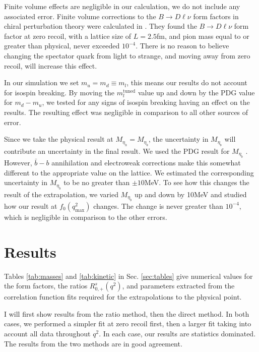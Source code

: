 Finite volume effects are negligible in our calculation, we do not include any associated error. Finite volume corrections to the $B\to D\ell\nu$ form factors in chiral perturbation theory were calculated in \cite{Laiho:2005ue}. They found the $B\to D\ell\nu$ form factor at zero recoil, with a lattice size of $L=2.5$fm, and pion mass equal to or greater than physical, never exceeded $10^{-4}$. There is no reason to believe changing the spectator quark from light to strange, and moving away from zero recoil, will increase this effect.

In our simulation we set $m_u=m_d\equiv m_l$, this means our results do not account for isospin breaking. By moving the $m_l^{\text{tuned}}$ value up and down by the PDG value for $m_d-m_u$, we tested for any signs of isospin breaking having an effect on the results. The resulting effect was negligible in comparison to all other sources of error.

Since we take the physical result at $M_{\eta_h}=M_{\eta_b}$, the uncertainty in $M_{\eta_b}$ will contribute an uncertainty in the final result. We used the PDG result for $M_{\eta_b}$ \cite{PhysRevD.98.030001}. However, $\bar{b}-b$ annihilation and electroweak corrections make this somewhat different to the appropriate value on the lattice. We estimated the corresponding uncertainty in $M_{\eta_b}$ to be no greater than $\pm10$MeV. To see how this changes the result of the extrapolation, we varied $M_{\eta_b}$ up and down by 10MeV and studied how our result at $f_0(q^2_{\text{max}})$ changes. The change is never greater than $10^{-4}$, which is negligible in comparison to the other errors.

\section{Results}
\label{sec:results}

Tables \ref{tab:masses} and \ref{tab:kinetic} in Sec. \ref{sec:tables} give numerical values for the form factors, the ratios $R_{0,+}^s(q^2)$, and parameters extracted from the correlation function fits required for the extrapolations to the physical point.

I will first show results from the ratio method, then the direct method. In both cases, we performed a simpler fit at zero recoil first, then a larger fit taking into account all data throughout $q^2$.  In each case, our results are statistics dominated. The results from the two methods are in good agreement.

